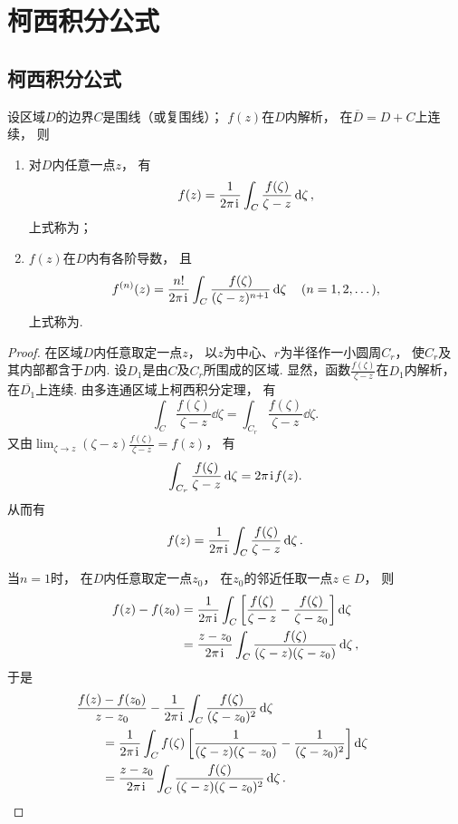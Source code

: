 \section{柯西积分公式}
\subsection{柯西积分公式}
\begin{theorem}\label{theorem:解析函数的积分表示.柯西积分公式}
设区域\(D\)的边界\(C\)是围线（或复围线）；
\(f(z)\)在\(D\)内解析，
在\(\overline{D}=D+C\)上连续，
则\begin{enumerate}
	\item 对\(D\)内任意一点\(z\)，
	有\begin{equation}\label{equation:解析函数的积分表示.柯西积分公式}
		f(z)
		= \frac{1}{2\pi\kern1pt\mathrm{i}\kern1pt}
		\int_C \frac{f(\zeta)}{\zeta-z} \dd{\zeta},
	\end{equation}
	上式称为；

	\item \(f(z)\)在\(D\)内有各阶导数，
	且\begin{equation}\label{equation:解析函数的积分表示.柯西高阶导数公式}
		f^{(n)}(z)
		= \frac{n!}{2\pi\kern1pt\mathrm{i}\kern1pt}
		\int_C \frac{f(\zeta)}{(\zeta-z)^{n+1}} \dd{\zeta}
		\quad (n=1,2,\dots),
	\end{equation}
	上式称为.
\end{enumerate}
\begin{proof}
在区域\(D\)内任意取定一点\(z\)，
以\(z\)为中心、\(r\)为半径作一小圆周\(C_r\)，
使\(C_r\)及其内部都含于\(D\)内.
设\(D_1\)是由\(C\)及\(C_r\)所围成的区域.
显然，函数\(\frac{f(\zeta)}{\zeta-z}\)在\(D_1\)内解析，
在\(\overline{D_1}\)上连续.
由多连通区域上柯西积分定理，
有\[
	\int_C \frac{f(\zeta)}{\zeta-z} \dd{\zeta}
	= \int_{C_r} \frac{f(\zeta)}{\zeta-z} \dd{\zeta}.
\]
又由\(\lim_{\zeta \to z} (\zeta-z) \frac{f(\zeta)}{\zeta-z} = f(z)\)，
有\[
	\int_{C_r} \frac{f(\zeta)}{\zeta-z} \dd{\zeta} = 2\pi\kern1pt\mathrm{i}\kern1pt f(z).
\]
从而有\[
	f(z) = \frac{1}{2\pi\kern1pt\mathrm{i}\kern1pt} \int_C \frac{f(\zeta)}{\zeta-z} \dd{\zeta}.
\]

当\(n=1\)时，
在\(D\)内任意取定一点\(z_0\)，
在\(z_0\)的邻近任取一点\(z \in D\)，
则\begin{align*}
	f(z)-f(z_0)
	&= \frac{1}{2\pi\kern1pt\mathrm{i}\kern1pt}
		\int_C \left[
			\frac{f(\zeta)}{\zeta-z}
			- \frac{f(\zeta)}{\zeta-z_0}
		\right] \dd{\zeta} \\
	&= \frac{z-z_0}{2\pi\kern1pt\mathrm{i}\kern1pt}
		\int_C \frac{f(\zeta)}{(\zeta-z)(\zeta-z_0)} \dd{\zeta},
\end{align*}
于是\begin{align*}
	&\hspace{-20pt}
		\frac{f(z)-f(z_0)}{z-z_0}
		- \frac{1}{2\pi\iu}
		\int_C \frac{f(\zeta)}{(\zeta-z_0)^2} \dd{\zeta} \\
	&=\frac{1}{2\pi\iu}
		\int_C f(\zeta)
		\left[
			\frac{1}{(\zeta-z)(\zeta-z_0)}-\frac{1}{(\zeta-z_0)^2}
		\right] \dd{\zeta} \\
	&=\frac{z-z_0}{2\pi\iu}
		\int_C \frac{f(\zeta)}{(\zeta-z)(\zeta-z_0)^2} \dd{\zeta}.
\end{align*}


\end{proof}
\end{theorem}

